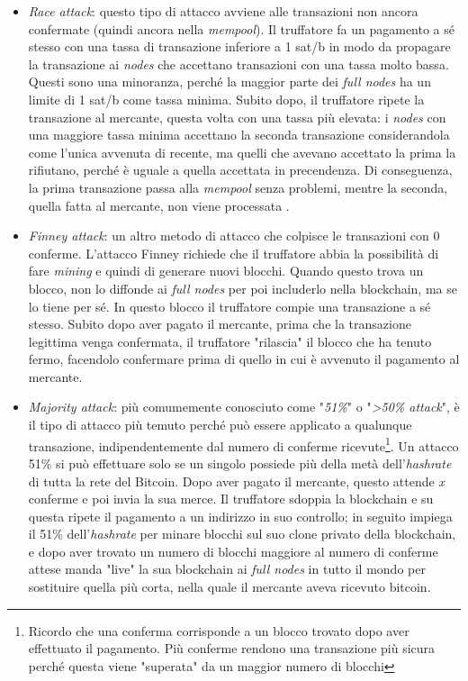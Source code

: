 \documentclass {article}
\begin{document}
\begin{itemize}
\item \textit{Race attack}: questo tipo di attacco avviene alle transazioni non ancora confermate (quindi ancora nella \textit{mempool}).
Il truffatore fa un pagamento a sé stesso con una tassa di transazione inferiore a 1 sat/b in modo da propagare la transazione ai \textit{nodes} che accettano transazioni con una tassa molto bassa.
Questi sono una minoranza, perché la maggior parte dei \textit{full nodes} ha un limite di 1 sat/b come tassa minima.
Subito dopo, il truffatore ripete la transazione al mercante, questa volta con una tassa più elevata: i \textit{nodes} con una maggiore tassa minima accettano la seconda transazione considerandola come l'unica avvenuta di recente, ma quelli che avevano accettato la prima la rifiutano, perché è uguale a quella accettata in precendenza.
Di conseguenza, la prima transazione passa alla \textit{mempool} senza problemi, mentre la seconda, quella fatta al mercante, non viene processata \cite{raceattack}\cite{attacks}.
\item \textit{Finney attack}: un altro metodo di attacco che colpisce le transazioni con 0 conferme. L'attacco Finney richiede che il truffatore abbia la possibilità di fare \textit{mining} e quindi di generare nuovi blocchi.
Quando questo trova un blocco, non lo diffonde ai \textit{full nodes} per poi includerlo nella blockchain, ma se lo tiene per sé.
In questo blocco il truffatore compie una transazione a sé stesso.
Subito dopo aver pagato il mercante, prima che la transazione legittima venga confermata, il truffatore "rilascia" il blocco che ha tenuto fermo, facendolo confermare prima di quello in cui è avvenuto il pagamento al mercante\cite{attacks}.
\item \textit{Majority attack}: più comumemente conosciuto come "\textit{51\%}" o "\textit{>50\% attack}", è il tipo di attacco più temuto perché può essere applicato a qualunque transazione, indipendentemente dal numero di conferme ricevute\footnote{Ricordo che una conferma corrisponde a un blocco trovato dopo aver effettuato il pagamento.
Più conferme rendono una transazione più sicura perché questa viene "superata" da un maggior numero di blocchi}.
Un attacco 51\% si può effettuare solo se un singolo possiede più della metà dell'\textit{hashrate} di tutta la rete del Bitcoin.
Dopo aver pagato il mercante, questo attende \textit{x} conferme e poi invia la sua merce.
Il truffatore sdoppia la blockchain e su questa ripete il pagamento a un indirizzo in suo controllo; in seguito impiega il 51\% dell'\textit{hashrate} per minare blocchi sul suo clone privato della blockchain, e dopo aver trovato un numero di blocchi maggiore al numero di conferme attese manda "live" la sua blockchain ai \textit{full nodes} in tutto il mondo per sostituire quella più corta, nella quale il mercante aveva ricevuto bitcoin\cite{attacks}.
\end{itemize}
\end{document}
